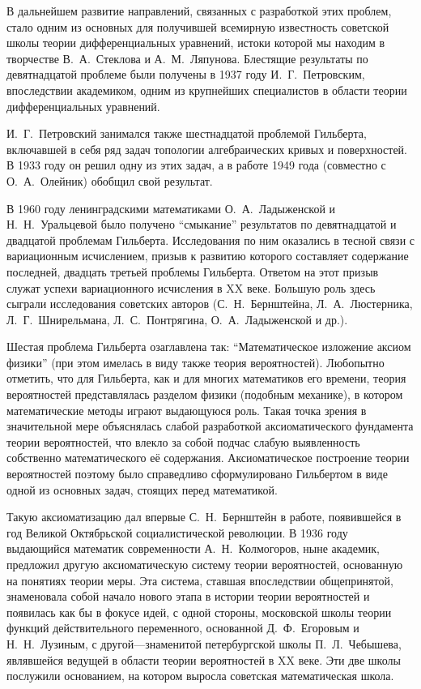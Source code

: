 \documentclass[twocolumn,10pt]{article}
\begin{document}
В дальнейшем развитие направлений, связанных с разработкой этих проблем, стало одним из основных для получившей всемирную известность советской школы теории дифференциальных уравнений, истоки которой мы находим в творчестве В.~А.~Стеклова и А.~М.~Ляпунова. Блестящие результаты по девятнадцатой проблеме были получены в 1937 году И.~Г.~Петровским, впоследствии академиком, одним из крупнейших специалистов в области теории дифференциальных уравнений.

И.~Г.~Петровский занимался также шестнадцатой проблемой Гильберта, включавшей в себя ряд задач топологии алгебраических кривых и поверхностей. В 1933 году он решил одну из этих задач, а в работе 1949 года (совместно с О.~А.~Олейник) обобщил свой результат.

В 1960 году ленинградскими математиками О.~А.~Ладыженской и Н.~Н.~Уральцевой было получено ``смыкание'' результатов по девятнадцатой и двадцатой проблемам Гильберта. Исследования по ним оказались в тесной связи с вариационным исчислением, призыв к развитию которого составляет содержание последней, двадцать третьей проблемы Гильберта. Ответом на этот призыв служат успехи вариационного исчисления в XX веке. Большую роль здесь сыграли исследования советских авторов (С.~Н.~Бернштейна, Л.~А.~Люстерника, Л.~Г.~Шнирельмана, Л.~С.~Понтрягина, О.~А.~Ладыженской и др.).

Шестая проблема Гильберта озаглавлена так: ``Математическое изложение аксиом физики'' (при этом имелась в виду также теория вероятностей). Любопытно отметить, что для Гильберта, как и для многих математиков его времени, теория вероятностей представлялась разделом физики (подобным механике), в котором математические методы играют выдающуюся роль. Такая точка зрения в значительной мере объяснялась слабой разработкой аксиоматического фундамента теории вероятностей, что влекло за собой подчас слабую выявленность собственно математического её содержания. Аксиоматическое построение теории вероятностей поэтому было справедливо сформулировано Гильбертом в виде одной из основных задач, стоящих перед математикой.

Такую аксиоматизацию дал впервые С.~Н.~Бернштейн в работе, появившейся в год Великой Октябрьской социалистической революции. В 1936 году выдающийся математик современности А.~Н.~Колмогоров, ныне академик, предложил другую аксиоматическую систему теории вероятностей, основанную на понятиях теории меры. Эта система, ставшая впоследствии общепринятой, знаменовала собой начало нового этапа в истории теории вероятностей и появилась как бы в фокусе идей, с одной стороны, московской школы теории функций действительного переменного, основанной Д.~Ф.~Егоровым и Н.~Н.~Лузиным, с другой---знаменитой петербургской школы П.~Л.~Чебышева, являвшейся ведущей в области теории вероятностей в XX веке. Эти две школы послужили основанием, на котором выросла советская математическая школа.
\end{document}
